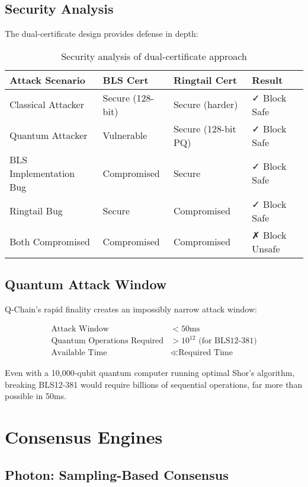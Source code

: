 \documentclass[11pt]{article}
\begin{document}
\subsection{Security Analysis}

The dual-certificate design provides defense in depth:

\begin{table}[h]
\centering
\small
\begin{tabular}{@{}llll@{}}
\toprule
\textbf{Attack Scenario} & \textbf{BLS Cert} & \textbf{Ringtail Cert} & \textbf{Result} \\
\midrule
Classical Attacker & Secure (128-bit) & Secure (harder) & ✓ Block Safe \\
Quantum Attacker & Vulnerable & Secure (128-bit PQ) & ✓ Block Safe \\
BLS Implementation Bug & Compromised & Secure & ✓ Block Safe \\
Ringtail Bug & Secure & Compromised & ✓ Block Safe \\
Both Compromised & Compromised & Compromised & ✗ Block Unsafe \\
\bottomrule
\end{tabular}
\caption{Security analysis of dual-certificate approach}
\label{tab:security}
\end{table}

\subsection{Quantum Attack Window}

Q-Chain's rapid finality creates an impossibly narrow attack window:

\begin{align}
\text{Attack Window} &< 50\text{ms} \\
\text{Quantum Operations Required} &> 10^{12} \text{ (for BLS12-381)} \\
\text{Available Time} &\ll \text{Required Time}
\end{align}

Even with a 10,000-qubit quantum computer running optimal Shor's algorithm, breaking BLS12-381 would require billions of sequential operations, far more than possible in 50ms.

\section{Consensus Engines}

\subsection{Photon: Sampling-Based Consensus}
\end{document}
